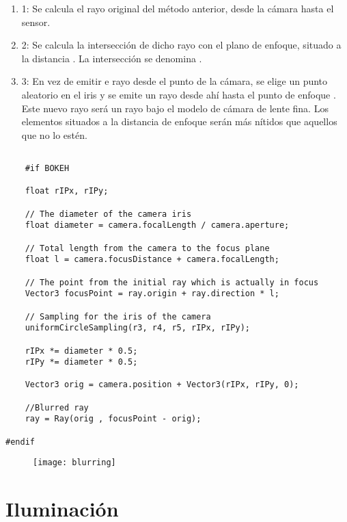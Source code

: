 	\begin{enumerate}
		
	\item 1: Se calcula el rayo original del método anterior, desde la cámara hasta el sensor.
	
	\item 2: Se calcula la intersección de dicho rayo con el plano de enfoque, situado a la distancia . La intersección se denomina .
	
	\item 3: En vez de emitir e rayo desde el punto de la cámara, se elige un punto aleatorio en el iris  y se emite un rayo desde ahí hasta el punto de enfoque . Este nuevo rayo será un rayo bajo el modelo de cámara de lente fina. Los elementos situados a la distancia de enfoque  serán más nítidos que aquellos que no lo estén.
	
	\end{enumerate}

\begin{lstlisting}
	
	#if BOKEH
	
    float rIPx, rIPy;

    // The diameter of the camera iris
    float diameter = camera.focalLength / camera.aperture;

    // Total length from the camera to the focus plane
    float l = camera.focusDistance + camera.focalLength;

    // The point from the initial ray which is actually in focus
    Vector3 focusPoint = ray.origin + ray.direction * l;

    // Sampling for the iris of the camera
    uniformCircleSampling(r3, r4, r5, rIPx, rIPy);

    rIPx *= diameter * 0.5;
    rIPy *= diameter * 0.5;

    Vector3 orig = camera.position + Vector3(rIPx, rIPy, 0);

    //Blurred ray
    ray = Ray(orig , focusPoint - orig);

#endif 

\end{lstlisting}

	\begin{figure}[H]
		\centering
		\texttt{[image: blurring]}
		\caption{}
		\label{fig:label}
	\end{figure}
	
	
	\section{Iluminación}
	
